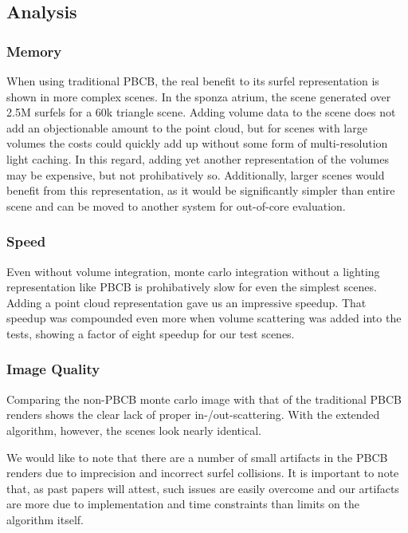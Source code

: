 \documentclass[runningheads]{llncs}
\begin{document}
\subsection{Analysis}

\subsubsection{Memory}
When using traditional PBCB, the real benefit to its surfel representation is shown in more complex scenes.  In the sponza atrium, the scene generated over 2.5M surfels for a 60k triangle scene.  Adding volume data to the scene does not add an objectionable amount to the point cloud, but for scenes with large volumes the costs could quickly add up without some form of multi-resolution light caching.  In this regard, adding yet another representation of the volumes may be expensive, but not prohibatively so.  Additionally, larger scenes would benefit from this representation, as it would be significantly simpler than entire scene and can be moved to another system for out-of-core evaluation.

\subsubsection{Speed}
Even without volume integration, monte carlo integration without a lighting representation like PBCB is prohibatively slow for even the simplest scenes.  Adding a point cloud representation gave us an impressive speedup.  That speedup was compounded even more when volume scattering was added into the tests, showing a factor of eight speedup for our test scenes.

\subsubsection*{Image Quality}
Comparing the non-PBCB monte carlo image with that of the traditional PBCB renders shows the clear lack of proper in-/out-scattering.  With the extended algorithm, however, the scenes look nearly identical.

We would like to note that there are a number of small artifacts in the PBCB renders due to imprecision and incorrect surfel collisions.  It is important to note that, as past papers will attest, such issues are easily overcome and our artifacts are more due to implementation and time constraints than limits on the algorithm itself. 
\end{document}
